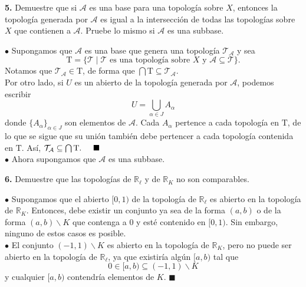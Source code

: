 \documentclass{article}
\begin{document}
\begin{mybox}
	\textbf{5. } Demuestre que si $\mathcal{A}$ es una base para una topología sobre $X$, entonces la topología generada por $\mathcal{A}$ es igual a la intersección de todas las topologías sobre $X$ que contienen a $\mathcal{A}.$ Pruebe lo mismo si $\mathcal{A}$ es una subbase. 
\end{mybox}	
$\bullet$ Supongamos que $\mathcal{A}$ es una base que genera una topología $\mathcal{T_{A}}$ y sea
$$ \mathrm{T} = \{ \mathcal{T} \mid \mathcal{T} \text{ es una topología sobre }X \text{ y }\mathcal{A}\subseteq \mathcal{T} \} .$$
Notamos que $\mathcal{T_{A}} \in \mathrm{T}$, de forma que $\bigcap \mathrm{T} \subseteq \mathcal{T_{A}}$.\\
Por otro lado,  si $U$ es un abierto de la topología generada por $\mathcal{A}$, podemos escribir
$$ U = \bigcup_{\alpha \in J} A_{\alpha} $$
donde $\{A_{\alpha} \}_{\alpha \in J}$ son elementos de $\mathcal{A}$. Cada $A_{\alpha}$ pertence a cada topología en $\mathrm{T}$, de lo que se sigue que su unión también debe pertencer a cada topología contenida en $\mathrm{T}.$ Así,  $\mathcal{T_{A}} \subseteq \bigcap \mathrm{T}.\hspace{0.5cm} \blacksquare$ \\

$\bullet $ Ahora supongamos que $\mathcal{A}$ es una subbase. 

\begin{mybox}
\textbf{6. } Demuestre que las topologías de $\mathbb{R}_{\ell}$ y de $\mathbb{R}_{K}$ no son comparables. 	
\end{mybox}	

$\bullet$  Supongamos que el abierto $[0, 1)$ de la topología de $\mathbb{R}_{\ell}$ es abierto en la topología de $\mathbb{R}_{K}$. Entonces, debe existir un conjunto ya sea de la forma $(a, b)$ o de la forma $(a, b) \backslash K$ que contenga a $0$ y esté contenido en $[0, 1)$. Sin embargo, ninguno de estos casos es posible. \\
$\bullet$ El conjunto $(-1, 1) \backslash K$ es abierto en la topología de $\mathbb{R}_{K}$, pero no puede ser abierto en la topología de $\mathbb{R}_{\ell}$, ya que existiría algún $[a, b)$ tal que
$$ 0 \in [a, b) \subseteq (-1, 1)\backslash K $$
y cualquier $[a, b)$ contendría elementos de $K$. \hspace{0.5cm} $\blacksquare$   
\end{document}
